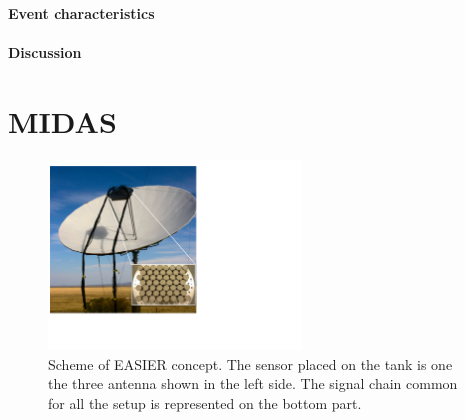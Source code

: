 \documentclass{PoS}
\begin{document}
\paragraph{Event characteristics}
\paragraph{Discussion}


\section{MIDAS}
\begin{figure}[h]
\centering
\includegraphics[width=0.6\textwidth]{midasdet.pdf}

\caption{Scheme of EASIER concept. The sensor  placed on the tank is one the three antenna shown in the left side. The signal chain common for all the setup is represented on the bottom part.}
\label{fig:baselines}
\end{figure}
\end{document}
